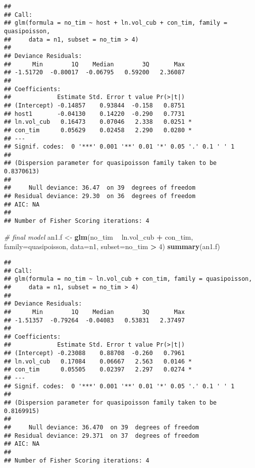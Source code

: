 \documentclass[]{article}
\newenvironment{Shaded}{\begin{snugshade}}{\end{snugshade}}
\newcommand{\KeywordTok}[1]{\textcolor[rgb]{0.13,0.29,0.53}{\textbf{#1}}}
\newcommand{\DataTypeTok}[1]{\textcolor[rgb]{0.13,0.29,0.53}{#1}}
\newcommand{\DecValTok}[1]{\textcolor[rgb]{0.00,0.00,0.81}{#1}}
\newcommand{\StringTok}[1]{\textcolor[rgb]{0.31,0.60,0.02}{#1}}
\newcommand{\CommentTok}[1]{\textcolor[rgb]{0.56,0.35,0.01}{\textit{#1}}}
\newcommand{\OperatorTok}[1]{\textcolor[rgb]{0.81,0.36,0.00}{\textbf{#1}}}
\newcommand{\NormalTok}[1]{#1}
\begin{document}
\begin{verbatim}
## 
## Call:
## glm(formula = no_tim ~ host + ln.vol_cub + con_tim, family = quasipoisson, 
##     data = n1, subset = no_tim > 4)
## 
## Deviance Residuals: 
##      Min        1Q    Median        3Q       Max  
## -1.51720  -0.80017  -0.06795   0.59200   2.36087  
## 
## Coefficients:
##             Estimate Std. Error t value Pr(>|t|)  
## (Intercept) -0.14857    0.93844  -0.158   0.8751  
## host1       -0.04130    0.14220  -0.290   0.7731  
## ln.vol_cub   0.16473    0.07046   2.338   0.0251 *
## con_tim      0.05629    0.02458   2.290   0.0280 *
## ---
## Signif. codes:  0 '***' 0.001 '**' 0.01 '*' 0.05 '.' 0.1 ' ' 1
## 
## (Dispersion parameter for quasipoisson family taken to be 0.8370613)
## 
##     Null deviance: 36.47  on 39  degrees of freedom
## Residual deviance: 29.30  on 36  degrees of freedom
## AIC: NA
## 
## Number of Fisher Scoring iterations: 4
\end{verbatim}

\begin{Shaded}
\begin{Highlighting}[]
\CommentTok{# final model}
\NormalTok{an1.f <-}\StringTok{ }\KeywordTok{glm}\NormalTok{(no_tim }\OperatorTok{~}\StringTok{ }\NormalTok{ln.vol_cub }\OperatorTok{+}\StringTok{ }\NormalTok{con_tim,}
             \DataTypeTok{family=}\NormalTok{quasipoisson, }
           \DataTypeTok{data=}\NormalTok{n1, }\DataTypeTok{subset=}\NormalTok{no_tim }\OperatorTok{>}\StringTok{ }\DecValTok{4}\NormalTok{)}
\KeywordTok{summary}\NormalTok{(an1.f)}
\end{Highlighting}
\end{Shaded}

\begin{verbatim}
## 
## Call:
## glm(formula = no_tim ~ ln.vol_cub + con_tim, family = quasipoisson, 
##     data = n1, subset = no_tim > 4)
## 
## Deviance Residuals: 
##      Min        1Q    Median        3Q       Max  
## -1.51357  -0.79264  -0.04083   0.53831   2.37497  
## 
## Coefficients:
##             Estimate Std. Error t value Pr(>|t|)  
## (Intercept) -0.23088    0.88708  -0.260   0.7961  
## ln.vol_cub   0.17084    0.06667   2.563   0.0146 *
## con_tim      0.05505    0.02397   2.297   0.0274 *
## ---
## Signif. codes:  0 '***' 0.001 '**' 0.01 '*' 0.05 '.' 0.1 ' ' 1
## 
## (Dispersion parameter for quasipoisson family taken to be 0.8169915)
## 
##     Null deviance: 36.470  on 39  degrees of freedom
## Residual deviance: 29.371  on 37  degrees of freedom
## AIC: NA
## 
## Number of Fisher Scoring iterations: 4
\end{verbatim}
\end{document}
